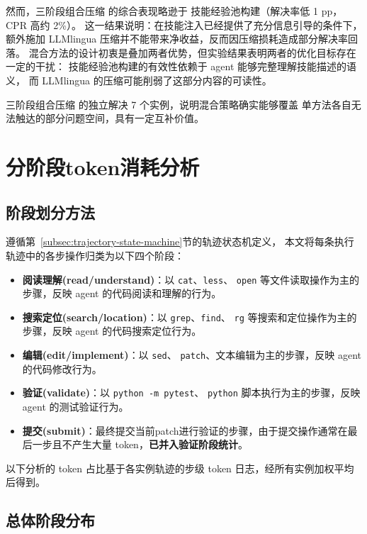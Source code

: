 然而，三阶段组合压缩 的综合表现略逊于
技能经验池构建（解决率低 1 pp，CPR 高约 2\%）。
这一结果说明：在技能注入已经提供了充分信息引导的条件下，
额外施加 LLMlingua 压缩并不能带来净收益，反而因压缩损耗造成部分解决率回落。
混合方法的设计初衷是叠加两者优势，但实验结果表明两者的优化目标存在一定的干扰：
技能经验池构建的有效性依赖于 agent 能够完整理解技能描述的语义，
而 LLMlingua 的压缩可能削弱了这部分内容的可读性。

三阶段组合压缩 的独立解决 7 个实例，说明混合策略确实能够覆盖
单方法各自无法触达的部分问题空间，具有一定互补价值。


\section{分阶段token消耗分析}
\label{sec:phase-breakdown}

\subsection{阶段划分方法}
\label{subsec:phase-method}

遵循第~\ref{subsec:trajectory-state-machine}节的轨迹状态机定义，
本文将每条执行轨迹中的各步操作归类为以下四个阶段：

\begin{itemize}
  \item \textbf{阅读理解(read/understand)}：以 \texttt{cat}、\texttt{less}、
        \texttt{open} 等文件读取操作为主的步骤，反映 agent 的代码阅读和理解的行为。
  \item \textbf{搜索定位(search/location)}：以 \texttt{grep}、\texttt{find}、
        \texttt{rg} 等搜索和定位操作为主的步骤，反映 agent 的代码搜索定位行为。
  \item \textbf{编辑(edit/implement)}：以 \texttt{sed}、
        \texttt{patch}、文本编辑为主的步骤，反映 agent 的代码修改行为。
  \item \textbf{验证(validate)}：以 \texttt{python -m pytest}、
        \texttt{python} 脚本执行为主的步骤，反映 agent 的测试验证行为。
  \item \textbf{提交(submit)}：最终提交当前patch进行验证的步骤，由于提交操作通常在最后一步且不产生大量 token，\textbf{已并入验证阶段统计}。
\end{itemize}
以下分析的 token 占比基于各实例轨迹的步级 token 日志，经所有实例加权平均后得到。

\subsection{总体阶段分布}
\label{subsec:phase-overall}

